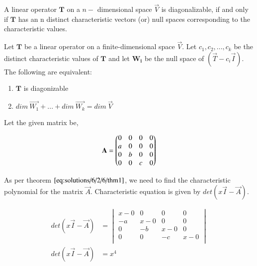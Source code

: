 	
	\begin{theorem}\label{eq:solutions/6/2/6/thm1}
	    A linear operator $\mathbf{T}$ on a $n-$ dimensional space $\Vec{V}$ is diagonalizable, if and only if  $\mathbf{T}$ has an n distinct characteristic vectors (or) null spaces corresponding to the characteristic values. 
	\end{theorem}
	
	\begin{theorem}\label{eq:solutions/6/2/6/thm2}
	    Let $\mathbf{T}$ be a linear operator on a finite-dimensional space $\Vec{V}$. Let $c_1, c_2,...,c_k$ be the distinct characteristic values of $\mathbf{T}$ and let $\mathbf{W_i}$ be the null space of $\left(\Vec{T}-c_{i}\Vec{I}\right)$. The following are equivalent:
	    \begin{enumerate}
	        \item $\mathbf{T}$ is diagonizable
	        \item $dim\ \Vec{W_1}+...+dim\ \Vec{W_k} = dim\ \Vec{V}$
	    \end{enumerate}
	\end{theorem}
	    
	
	
	Let the given matrix be,
    
    \begin{align}
        \mathbf{A} = \begin{pmatrix}0&0&0&0 \\ a&0&0&0 \\ 0&b&0&0 \\ 0&0&c&0\end{pmatrix}
    \end{align}
	
	As per theorem $\ref{eq:solutions/6/2/6/thm1}$, we need to find the characteristic polynomial for the matrix $\Vec{A}$. Characteristic equation is given by $det\left ( x\Vec{I} - \Vec{A}\right)$.
	
	\begin{align}
	    det\left(x\Vec{I} - \Vec{A}\right) &= \begin{vmatrix}
                                                x-0 & 0 & 0 & 0 \\ 
                                                -a & x-0 & 0 & 0 \\
                                                0 & -b & x-0 & 0 \\
                                                0 & 0 & -c & x-0 \\
                                            \end{vmatrix}\\
        det\left(x\Vec{I} - \Vec{A}\right) &= x^{4}
	\end{align}
	
